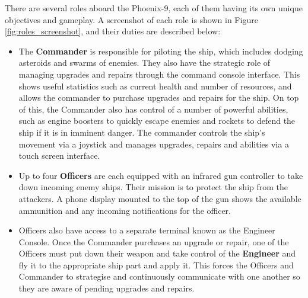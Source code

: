 \documentclass[a4paper,11pt]{article}
\begin{document}
There are several roles aboard the Phoenix-9, each of them having its own unique objectives and gameplay. A screenshot of each role is shown in Figure \ref{fig:roles_screenshot}, and their duties are described below:

\begin{itemize}[noitemsep,topsep=.5ex]
  \item The \textbf{Commander} is responsible for piloting the ship, which includes dodging asteroids and swarms of enemies. They also have the strategic role of managing upgrades and repairs through the command console interface. This shows useful statistics such as current health and number of resources, and allows the commander to purchase upgrades and repairs for the ship. On top of this, the Commander also has control of a number of powerful abilities, such as engine boosters to quickly escape enemies and rockets to defend the ship if it is in imminent danger. 
  The commander controls the ship's movement via a joystick and manages upgrades, repairs and abilities via a touch screen interface. 

  \item Up to four \textbf{Officers} are each equipped with an infrared gun controller to take down incoming enemy ships. Their mission is to protect the ship from the attackers. A phone display mounted to the top of the gun shows the available ammunition and any incoming notifications for the officer.

  \item Officers also have access to a separate terminal known as the Engineer Console. Once the Commander purchases an upgrade or repair, one of the Officers must put down their weapon and take control of the \textbf{Engineer} and fly it to the appropriate ship part and apply it. This forces the Officers and Commander to strategise and continuously communicate with one another so they are aware of pending upgrades and repairs.
\end{itemize}
\end{document}
